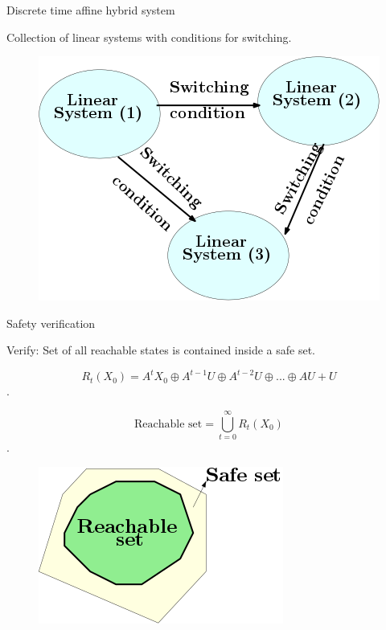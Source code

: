 \begin{frame}{Discrete time affine hybrid system}

{\color{blue} Collection of linear systems} with {\color{blue} conditions for switching}.
%
\begin{figure}
\includegraphics[scale=0.5]{figures/affine-hybrid.png}
\end{figure}
%
\end{frame}



\begin{frame}{Safety verification}

{\color{violet} Verify:} {\color{blue} Set of all reachable states} is {\color{blue} contained inside a safe set.}

{\color{purple} \[ R_t(X_0)  = A^tX_0\oplus A^{t-1}U\oplus A^{t-2}U\oplus ...\oplus AU+U\].}\vspace{-2em}

{\color{purple} \[\text{Reachable set} = \bigcup_{t=0}^\infty R_t(X_0)\]}.
%
\begin{figure}
\includegraphics[scale=0.5]{figures/safety.png}
\end{figure}
%
\end{frame}

